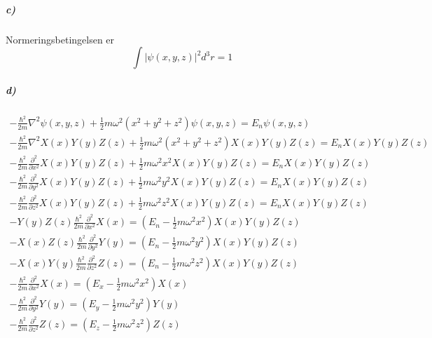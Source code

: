\documentclass[11pt, A4paper,norsk]{article}
\begin{document}
			









			\subparagraph{c)}
				\begin{flushleft}
Normeringsbetingelsen er
$$\int |\psi(x, y, z)|^2 d^3r = 1$$
				\end{flushleft}










			\subparagraph{d)}
				\begin{gather*}
- \frac{\hbar^2}{2 m} \nabla^2 \psi(x, y, z) + \frac{1}{2} m \omega^2(x^2 + y^2 + z^2) \psi(x, y, z) = E_n \psi(x, y, z) \\
- \frac{\hbar^2}{2 m} \nabla^2 X(x)Y(y)Z(z) + \frac{1}{2} m \omega^2(x^2 + y^2 + z^2) X(x)Y(y)Z(z) = E_n X(x)Y(y)Z(z) \\
- \frac{\hbar^2}{2 m} \frac{\partial^2}{\partial x^2} X(x)Y(y)Z(z) + \frac{1}{2} m \omega^2 x^2 X(x)Y(y)Z(z) = E_n X(x)Y(y)Z(z) \\
- \frac{\hbar^2}{2 m} \frac{\partial^2}{\partial y^2} X(x)Y(y)Z(z) + \frac{1}{2} m \omega^2 y^2 X(x)Y(y)Z(z) = E_n X(x)Y(y)Z(z) \\
- \frac{\hbar^2}{2 m} \frac{\partial^2}{\partial z^2} X(x)Y(y)Z(z) + \frac{1}{2} m \omega^2 z^2 X(x)Y(y)Z(z) = E_n X(x)Y(y)Z(z) \\
- Y(y)Z(z) \frac{\hbar^2}{2 m} \frac{\partial^2}{\partial x^2} X(x) = \left( E_n - \frac{1}{2} m \omega^2 x^2 \right) X(x)Y(y)Z(z) \\
- X(x)Z(z) \frac{\hbar^2}{2 m} \frac{\partial^2}{\partial y^2} Y(y) = \left( E_n - \frac{1}{2} m \omega^2 y^2 \right) X(x)Y(y)Z(z) \\
- X(x)Y(y) \frac{\hbar^2}{2 m} \frac{\partial^2}{\partial z^2} Z(z) = \left( E_n - \frac{1}{2} m \omega^2 z^2 \right) X(x)Y(y)Z(z) \\
- \frac{\hbar^2}{2 m} \frac{\partial^2}{\partial x^2} X(x) = \left( E_x - \frac{1}{2} m \omega^2 x^2 \right) X(x) \\
- \frac{\hbar^2}{2 m} \frac{\partial^2}{\partial y^2} Y(y) = \left( E_y - \frac{1}{2} m \omega^2 y^2 \right) Y(y) \\
- \frac{\hbar^2}{2 m} \frac{\partial^2}{\partial z^2} Z(z) = \left( E_z - \frac{1}{2} m \omega^2 z^2 \right) Z(z) \\
				\end{gather*}
\end{document}
